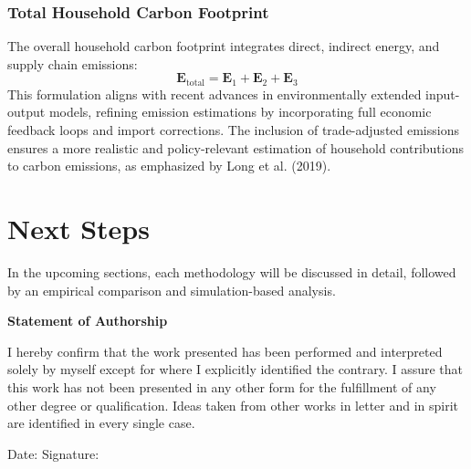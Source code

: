\documentclass[12pt,a4paper]{article}
\begin{document}
\subsubsection*{Total Household Carbon Footprint}
The overall household carbon footprint integrates direct, indirect energy, and supply chain emissions:
\begin{equation}
    \mathbf{E}_{\text{total}} = \mathbf{E}_1 + \mathbf{E}_2 + \mathbf{E}_3
\end{equation}
This formulation aligns with recent advances in environmentally extended input-output models, refining emission estimations by incorporating full economic feedback loops and import corrections. The inclusion of trade-adjusted emissions ensures a more realistic and policy-relevant estimation of household contributions to carbon emissions, as emphasized by Long et al. (2019).



\section{Next Steps}
In the upcoming sections, each methodology will be discussed in detail, followed by an empirical comparison and simulation-based analysis.




\newpage
\thispagestyle{empty}
\vspace*{5cm}
\begin{center}
    \textbf{Statement of Authorship}
\end{center}

\vspace{1cm}
\noindent
I hereby confirm that the work presented has been performed and interpreted solely by myself except for where I explicitly identified the contrary. I assure that this work has not been presented in any other form for the fulfillment of any other degree or qualification. Ideas taken from other works in letter and in spirit are identified in every single case.

\vspace{2cm}
\noindent
Date: \hrulefill \hfill Signature: \hrulefill
\end{document}
